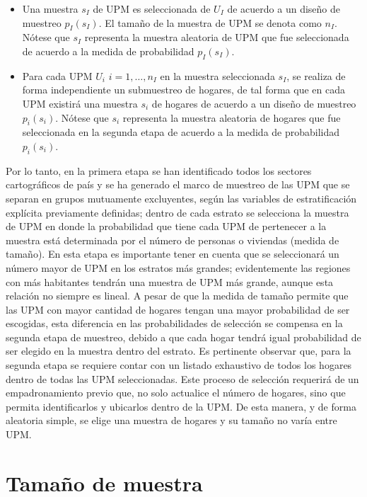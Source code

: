 \documentclass[12pt,spanish,]{book}
\providecommand{\tightlist}{%
  \setlength{\itemsep}{0pt}\setlength{\parskip}{0pt}}
\begin{document}
\begin{itemize}
\tightlist
\item
  Una muestra \(s_I\) de UPM es seleccionada de \(U_I\) de acuerdo a un diseño de muestreo \(p_I(s_I)\). El tamaño de la muestra de UPM se denota como \(n_I\). Nótese que \(s_I\) representa la muestra aleatoria de UPM que fue seleccionada de acuerdo a la medida de probabilidad \(p_I(s_I)\).
\item
  Para cada UPM \(U_i\) \(i=1,\dots,n_I\) en la muestra seleccionada \(s_I\), se realiza de forma independiente un submuestreo de hogares, de tal forma que en cada UPM existirá una muestra \(s_i\) de hogares de acuerdo a un diseño de muestreo \(p_i(s_i)\). Nótese que \(s_i\) representa la muestra aleatoria de hogares que fue seleccionada en la segunda etapa de acuerdo a la medida de probabilidad \(p_i(s_i)\).
\end{itemize}

Por lo tanto, en la primera etapa se han identificado todos los sectores cartográficos de país y se ha generado el marco de muestreo de las UPM que se separan en grupos mutuamente excluyentes, según las variables de estratificación explícita previamente definidas; dentro de cada estrato se selecciona la muestra de UPM en donde la probabilidad que tiene cada UPM de pertenecer a la muestra está determinada por el número de personas o viviendas (medida de tamaño). En esta etapa es importante tener en cuenta que se seleccionará un número mayor de UPM en los estratos más grandes; evidentemente las regiones con más habitantes tendrán una muestra de UPM más grande, aunque esta relación no siempre es lineal. A pesar de que la medida de tamaño permite que las UPM con mayor cantidad de hogares tengan una mayor probabilidad de ser escogidas, esta diferencia en las probabilidades de selección se compensa en la segunda etapa de muestreo, debido a que cada hogar tendrá igual probabilidad de ser elegido en la muestra dentro del estrato. Es pertinente observar que, para la segunda etapa se requiere contar con un listado exhaustivo de todos los hogares dentro de todas las UPM seleccionadas. Este proceso de selección requerirá de un empadronamiento previo que, no solo actualice el número de hogares, sino que permita identificarlos y ubicarlos dentro de la UPM. De esta manera, y de forma aleatoria simple, se elige una muestra de hogares y su tamaño no varía entre UPM.

\hypertarget{tamano-de-muestra}{%
\chapter{Tamaño de muestra}\label{tamano-de-muestra}}
\end{document}
